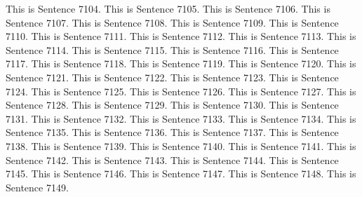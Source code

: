 \documentclass{article}
\begin{document}
This is Sentence 7104.
This is Sentence 7105.
This is Sentence 7106.
This is Sentence 7107.
This is Sentence 7108.
This is Sentence 7109.
This is Sentence 7110.
This is Sentence 7111.
This is Sentence 7112.
This is Sentence 7113.
This is Sentence 7114.
This is Sentence 7115.
This is Sentence 7116.
This is Sentence 7117.
This is Sentence 7118.
This is Sentence 7119.
This is Sentence 7120.
This is Sentence 7121.
This is Sentence 7122.
This is Sentence 7123.
This is Sentence 7124.
This is Sentence 7125.
This is Sentence 7126.
This is Sentence 7127.
This is Sentence 7128.
This is Sentence 7129.
This is Sentence 7130.
This is Sentence 7131.
This is Sentence 7132.
This is Sentence 7133.
This is Sentence 7134.
This is Sentence 7135.
This is Sentence 7136.
This is Sentence 7137.
This is Sentence 7138.
This is Sentence 7139.
This is Sentence 7140.
This is Sentence 7141.
This is Sentence 7142.
This is Sentence 7143.
This is Sentence 7144.
This is Sentence 7145.
This is Sentence 7146.
This is Sentence 7147.
This is Sentence 7148.
This is Sentence 7149.
\end{document}
